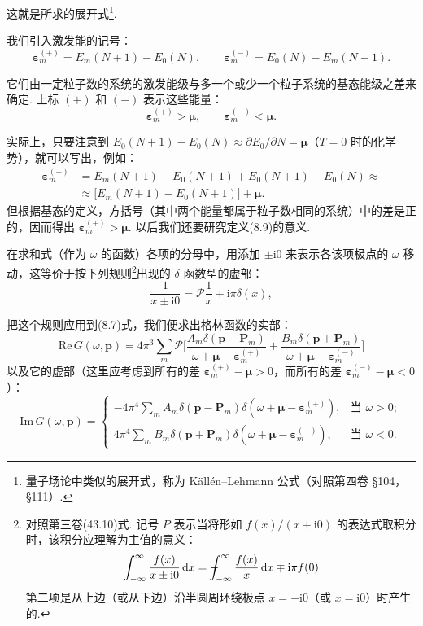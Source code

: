 这就是所求的展开式\footnote{量子场论中类似的展开式，称为 K\"all\'en--Lehmann 公式（对照第四卷 §104，§111）.}.

我们引入激发能的记号：
\begin{equation}
\bm\varepsilon^{(+)}_m=E_m(N+1)-E_0(N),\qquad \bm\varepsilon^{(-)}_m=E_0(N)-E_m(N-1).
\end{equation}

它们由一定粒子数的系统的激发能级与多一个或少一个粒子系统的基态能级之差来确定. 上标 $(+)$ 和 $(-)$ 表示这些能量：
\begin{equation}
\bm\varepsilon^{(+)}_m>\bm\mu,\qquad \bm\varepsilon^{(-)}_m<\bm\mu.
\end{equation}

实际上，只要注意到 $E_0(N+1)-E_0(N)\approx\partial E_0/\partial N=\bm\mu$（$T=0$ 时的化学势），就可以写出，例如：
\begin{equation*}
\begin{aligned}
\bm\varepsilon^{(+)}_m&=E_m(N+1)-E_0(N+1)+E_0(N+1)-E_0(N)\approx\\
&\approx\big[E_m(N+1)-E_0(N+1)\big]+\bm\mu.
\end{aligned}
\end{equation*}
但根据基态的定义，方括号（其中两个能量都属于粒子数相同的系统）中的差是正的，因而得出 $\bm\varepsilon^{(+)}_m>\bm\mu$. 以后我们还要研究定义(8.9)的意义.

在求和式（作为 $\omega$ 的函数）各项的分母中，用添加 $\pm\mathrm{i}0$ 来表示各该项极点的 $\omega$ 移动，这等价于按下列规则\footnote{对照第三卷(43.10)式. 记号 $P$ 表示当将形如 $f(x)/(x+\mathrm{i}0)$ 的表达式取积分时，该积分应理解为主值的意义：
\begin{equation*}
\int_{-\infty}^{\infty}\frac{f(x)}{x\pm\mathrm{i}0}\,\mathrm{d}x
=-\hspace{-1.0em}\int_{-\infty}^{\infty}\frac{f(x)}{x}\,\mathrm{d}x\mp\mathrm{i}\pi f(0)
\end{equation*}
第二项是从上边（或从下边）沿半圆周环绕极点 $x=-\mathrm{i}0$（或 $x=\mathrm{i}0$）时产生的.}出现的 $\delta$ 函数型的虚部：
\begin{equation}
\frac{1}{x\pm\mathrm{i}0}=\mathcal{P}\frac{1}{x}\mp\mathrm{i}\pi\delta(x),
\end{equation}

把这个规则应用到(8.7)式，我们便求出格林函数的实部：
\begin{equation}
\mathrm{Re}\,G(\omega,\bm p)=4\pi^3\sum_m\mathcal{P}\Big[\frac{A_m\delta(\bm p-\bm P_m)}{\omega+\bm\mu-\bm\varepsilon^{(+)}_m}+\frac{B_m\delta(\bm p+\bm P_m)}{\omega+\bm\mu-\bm\varepsilon^{(-)}_m}\Big]
\end{equation}
以及它的虚部（这里应考虑到所有的差 $\bm\varepsilon^{(+)}_m-\bm\mu>0$，而所有的差 $\bm\varepsilon^{(-)}_m-\bm\mu<0$）：
\begin{equation}
\mathrm{Im}\,G(\omega,\bm p)=
\begin{cases}
-4\pi^4\displaystyle\sum_m A_m\delta(\bm p-\bm P_m)\delta(\omega+\bm\mu-\bm\varepsilon^{(+)}_m),& \text{当 }\omega>0;\\[0.8em]
4\pi^4\displaystyle\sum_m B_m\delta(\bm p+\bm P_m)\delta(\omega+\bm\mu-\bm\varepsilon^{(-)}_m),& \text{当 }\omega<0.
\end{cases}
\end{equation}

